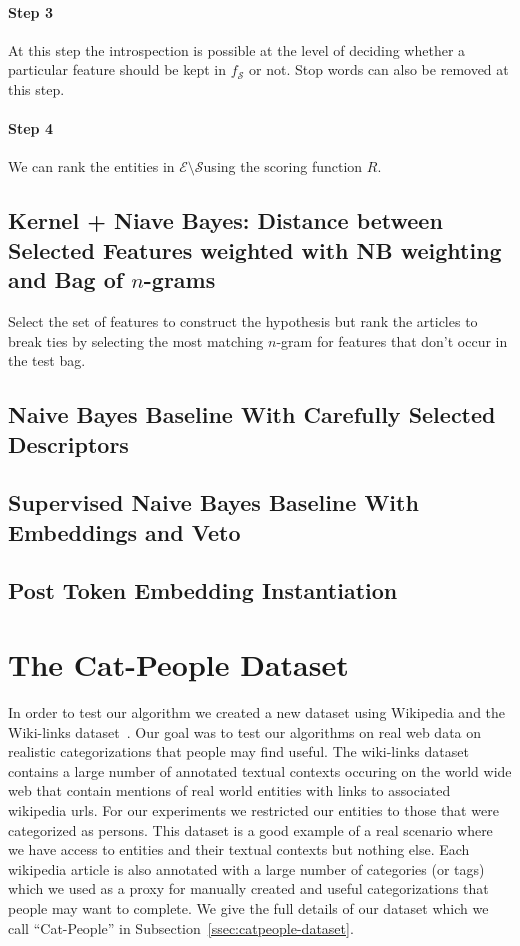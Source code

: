 \documentclass{article}
\newcommand{\ssecref}[1]{Subsection~\ref{#1}}
\newcommand{\ems}{$\mathcal{E} \setminus \mathcal{S}$}
\begin{document}
\paragraph{Step 3}
At this step the introspection is possible at the level of deciding whether a
particular feature should be kept in $f_{\mathcal{S}}$ or not. Stop words can
also be removed at this step.
\paragraph{Step 4}
We can rank the entities in \ems using the scoring function $R$.

\subsection{Kernel + Niave Bayes: Distance between Selected Features weighted
  with NB weighting and Bag of $n$-grams}
\label{sec:kernel-nb}
Select the set of features to construct the hypothesis but rank the articles to
break ties by selecting the most matching $n$-gram for features that don't occur
in the test bag.

\subsection{Naive Bayes Baseline With Carefully Selected Descriptors}
\label{ssec:baseline-wsim}


\subsection{Supervised Naive Bayes Baseline With Embeddings and Veto}
\label{ssec:baseline-wsim-veto}

\subsection{Post Token Embedding Instantiation}
\label{ssec:method-tokenemb}

\section{The Cat-People Dataset}
\label{sec:cat-people-dataset}
In order to test our algorithm we created a new dataset using Wikipedia and the
Wiki-links dataset~\cite{singh2012wikilinks}. Our goal was to test our
algorithms on real web data on realistic categorizations that people may find
useful. The wiki-links dataset contains a large number of annotated textual contexts
occuring on the world wide web that contain mentions of real world entities with
links to associated wikipedia urls. For our experiments we restricted our
entities to those that were categorized as persons. This dataset is a good example of a real
scenario where we have access to entities and their textual contexts but nothing
else. Each wikipedia article is also annotated with a large number of categories (or
tags) which we used as a proxy for manually created and useful categorizations
that people may want to complete. We give the full details of our dataset which
we call ``Cat-People'' in \ssecref{ssec:catpeople-dataset}.
\end{document}
